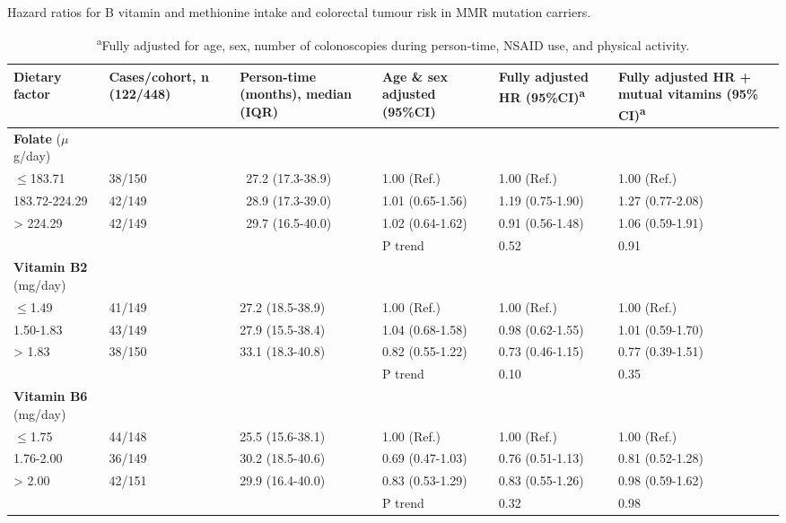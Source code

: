 \begin{sidewaystable}
\caption{Hazard ratios for B vitamin and methionine intake and colorectal tumour risk in MMR mutation carriers.}
\label{table6_2}
\begin{adjustbox}{width=\textwidth}
\begin{tabular}{L{2.7cm}C{2.5cm}C{3.1cm}C{3.1cm}C{3.1cm}C{3.1cm}}
\hline
\parbox[c][1.7cm]{2.7cm}{\raggedright \textbf{Dietary factor}} &
\parbox[c][1.7cm]{2.5cm}{\centering \textbf{Cases/cohort, n (122/448)}} &
\parbox[c][1.7cm]{3.1cm}{\centering \textbf{Person-time (months), median (IQR)}} &
\parbox[c][1.7cm]{3.1cm}{\centering \textbf{Age \& sex adjusted (95\%CI)}} &
\parbox[c][1.7cm]{3.1cm}{\centering \textbf{Fully adjusted HR (95\%CI)}{\textsuperscript{a}}} &
\parbox[c][1.7cm]{3.1cm}{\centering \textbf{Fully adjusted HR + mutual vitamins (95\% CI)}{\textsuperscript{a}}}\\
\hline
{\textbf{Folate}}{ ($\mu$g/day)} & ~ & ~ & ~ & ~ & ~ \\
{\textrm{${\leq}$}}{183.71} & 38/150 & \ 27.2 (17.3-38.9) & 1.00 (Ref.) & 1.00 (Ref.) & 1.00 (Ref.)\\
183.72-224.29 & 42/149 & \ 28.9 (17.3-39.0) & 1.01 (0.65-1.56) & 1.19 (0.75-1.90) & 1.27 (0.77-2.08)\\
{\textgreater} 224.29 & 42/149 & \ 29.7 (16.5-40.0) & 1.02 (0.64-1.62) & 0.91 (0.56-1.48) & 1.06 (0.59-1.91)\\ ~ & ~ & ~ & P trend & 0.52 & 0.91\\

{\textbf{Vitamin B2}}{ (mg/day)} & ~ & ~ & ~ & ~ & ~ \\
{\textrm{${\leq}$}}{1.49} & 41/149 & 27.2 (18.5-38.9) & 1.00 (Ref.) & 1.00 (Ref.) & 1.00 (Ref.)\\
1.50-1.83 & 43/149 & 27.9 (15.5-38.4) & 1.04 (0.68-1.58) & 0.98 (0.62-1.55) & 1.01 (0.59-1.70)\\
{\textgreater} 1.83 & 38/150 & 33.1 (18.3-40.8) & 0.82 (0.55-1.22) & 0.73 (0.46-1.15) & 0.77 (0.39-1.51)\\ ~ & ~ & ~ & P trend & 0.10 & 0.35\\

{\textbf{Vitamin B6}}{ (mg/day)} & ~ & ~ & ~ & ~ & ~ \\
{\textrm{${\leq}$}}{1.75} & 44/148 & 25.5 (15.6-38.1) & 1.00 (Ref.) & 1.00 (Ref.) & 1.00 (Ref.)\\
1.76-2.00 & 36/149 & 30.2 (18.5-40.6) & 0.69 (0.47-1.03) & 0.76 (0.51-1.13) & 0.81 (0.52-1.28)\\
{\textgreater} 2.00 & 42/151 & 29.9 (16.4-40.0) & 0.83 (0.53-1.29) & 0.83 (0.55-1.26) & 0.98 (0.59-1.62)\\ ~ & ~ & ~ & P trend & 0.32 & 0.98\\
\hline
\end{tabular}
\end{adjustbox}
\caption*{\footnotesize{\textsuperscript{a}Fully adjusted for age, sex, number of colonoscopies during person-time, NSAID use, and physical activity.}}
\end{sidewaystable}

